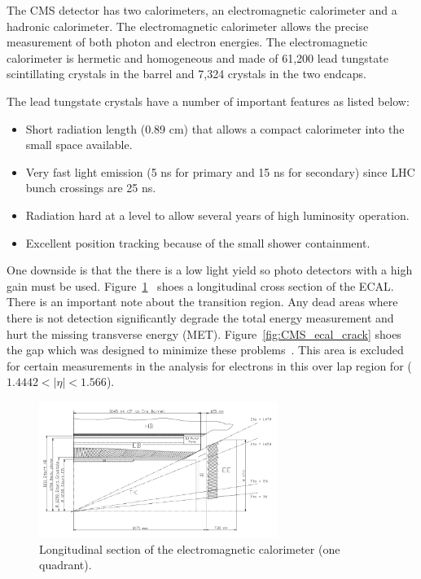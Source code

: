 The CMS detector has two calorimeters, an electromagnetic calorimeter and a hadronic calorimeter. The electromagnetic calorimeter allows the precise measurement of both photon and electron energies.  The electromagnetic calorimeter is hermetic and homogeneous and made of 61,200 lead tungstate scintillating crystals in the barrel and 7,324 crystals in the two endcaps.~\cite{ECAL_report}

The lead tungstate crystals have a number of important features as listed below:
\begin{itemize}
  \item
    Short radiation length (0.89 cm) that allows a compact calorimeter into the small space available.
  \item
    Very fast light emission (5 ns for primary and 15 ns for secondary) since LHC bunch crossings are 25 ns.
    \item
      Radiation hard at a level to allow several years of high luminosity operation.
    \item
      Excellent position tracking because of the small shower containment. 
\end{itemize}

One downside is that the there is a low light yield so photo detectors with a high gain must be used.  Figure~\ref{fig:CMS_ecal_quadrant}~\cite{ECAL_report} shoes a longitudinal cross section of the ECAL. There is an important note about the transition region.  Any dead areas where there is not detection significantly degrade the total energy measurement and hurt the missing transverse energy (MET). Figure~\ref{fig:CMS_ecal_crack} shoes the gap which was designed to minimize these problems~\cite{ECAL_report}.  This area is excluded for certain measurements in the analysis for electrons in this over lap region for ($1.4442 < |\eta| < 1.566$).

\begin{figure}[htb]
\centering
\includegraphics[width=0.69\textwidth]{Experiment/ECAL_quadrant.pdf}
\caption{Longitudinal section of the electromagnetic calorimeter (one quadrant).~\cite{ECAL_report}}
\label{fig:CMS_ecal_quadrant}
\end{figure}

